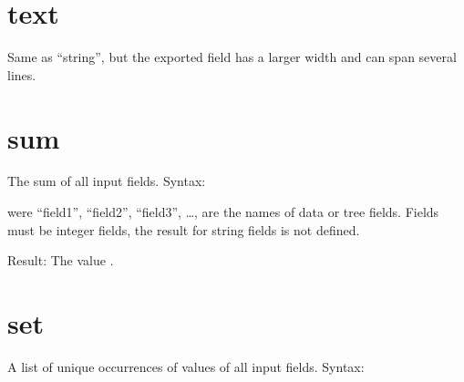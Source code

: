 \documentclass[letterpaper,10pt,english]{sphinxmanual}
\begin{document}
\section{text}
\label{\detokenize{tree-fields:text}}
\sphinxAtStartPar
Same as “string”, but the exported field has a larger width and can span several lines.


\section{sum}
\label{\detokenize{tree-fields:sum}}
\sphinxAtStartPar
The sum of all input fields.
Syntax:

\begin{sphinxVerbatim}[commandchars=\\\{\}]
 
     
     \PYG{p}{[}  \PYG{p}{]}
     \PYG{p}{[} \PYG{p}{]}
     \PYG{p}{[}\PYG{p}{]}
     \PYG{p}{[}\PYG{p}{]}
\end{sphinxVerbatim}

\sphinxAtStartPar
were “field1”, “field2”, “field3”, …, are the names of data or tree fields. Fields must be integer fields, the result for string fields is not defined.

\sphinxAtStartPar
Result: The value .


\section{set}
\label{\detokenize{tree-fields:set}}
\sphinxAtStartPar
A list of unique occurrences of values of all input fields.
Syntax:
\end{document}
